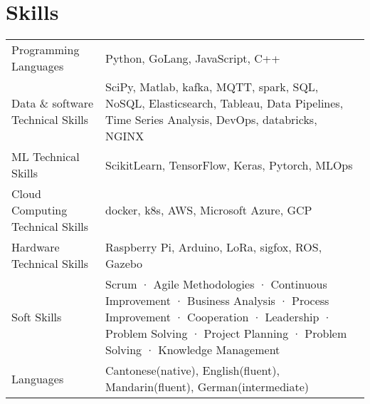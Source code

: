 \documentclass[a4paper,12pt]{article}
\begin{document}
\section{Skills}
\begin{tabularx}{\linewidth}{@{}l X@{}}
Programming Languages & \normalsize{Python, GoLang, JavaScript, C++}\\
Data \& software Technical Skills &  \normalsize{SciPy, Matlab, kafka, MQTT, spark, SQL, NoSQL, Elasticsearch, Tableau, Data Pipelines, Time Series Analysis, DevOps, databricks, NGINX}\\
ML Technical Skills & \normalsize{ScikitLearn, TensorFlow, Keras, Pytorch, MLOps} \\
Cloud Computing Technical Skills &  \normalsize{docker, k8s, AWS, Microsoft Azure, GCP} \\
Hardware Technical Skills & \normalsize{Raspberry Pi, Arduino, LoRa, sigfox, ROS, Gazebo}\\
Soft Skills  &  \normalsize{Scrum · Agile Methodologies · Continuous Improvement · Business Analysis · Process Improvement · Cooperation · Leadership · Problem Solving · Project Planning · Problem Solving · Knowledge Management}\\  
Languages & \normalsize{Cantonese(native), English(fluent), Mandarin(fluent), German(intermediate)}
\end{tabularx}

\vfill
{}
\end{document}
